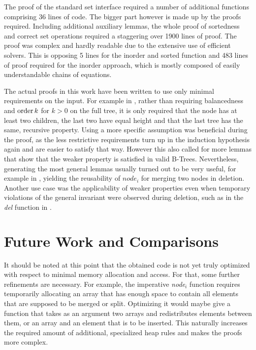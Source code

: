 The proof of the standard set interface required a number of additional functions
comprising 36 lines of code.
The bigger part however is made up by the proofs required.
Including additional auxiliary lemmas, the whole proof of sortedness
and correct set operations required a staggering over 1900 lines of proof.
The proof was complex and hardly readable due to the 
extensive use of efficient solvers.
This is opposing 5 lines for the inorder and sorted function and
483 lines of proof required for the inorder approach,
which is mostly composed of easily understandable chains of equations.


The actual proofs in this work have been written to use only
minimal requirements on the input.
For example in , rather than
requiring balancedness and $\operatorname{order} k$ for $k > 0$ on the full tree,
it is only required that the node has at least two children,
the last two have equal height
and that the last tree has the same, recursive property.
Using a more specific assumption was beneficial during the proof,
as the less restrictive requirements turn up in the
induction hypothesis again and are easier to satisfy that way.
However this also called for more lemmas that show that
the weaker property is satisfied in valid B-Trees.
Nevertheless, generating the most general lemmas usually turned out to be
very useful, for example in , yielding the reusability of $node_i$ for
merging two nodes in deletion.
Another use case was the applicability of weaker properties
even when temporary violations
of the general invariant were observed during deletion,
such as in the \textit{del} function in .

\section{Future Work and Comparisons}

It should be noted at this point that the obtained code is not yet
truly optimized with respect to minimal memory allocation and access.
For that, some further refinements are necessary.
For example, the imperative \textit{node$_i$} function
requires temporarily allocating
an array that has enough space to contain
all elements that are supposed to be merged or split.
Optimizing it would maybe give a function that takes
as an argument two arrays and redistributes elements between them,
or an array and an element that is to be inserted.
This naturally increases the required amount of additional,
specialized heap rules and makes the proofs more complex.


